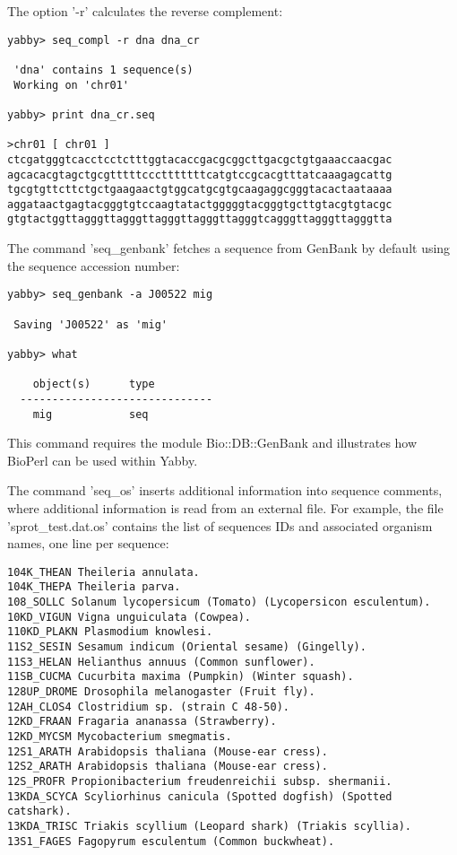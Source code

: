 The option '-r' calculates the reverse complement: 

\begin{verbatim}
yabby> seq_compl -r dna dna_cr

 'dna' contains 1 sequence(s)
 Working on 'chr01'

yabby> print dna_cr.seq

>chr01 [ chr01 ]
ctcgatgggtcacctcctctttggtacaccgacgcggcttgacgctgtgaaaccaacgac
agcacacgtagctgcgtttttccctttttttcatgtccgcacgtttatcaaagagcattg
tgcgtgttcttctgctgaagaactgtggcatgcgtgcaagaggcgggtacactaataaaa
aggataactgagtacgggtgtccaagtatactgggggtacgggtgcttgtacgtgtacgc
gtgtactggttagggttagggttagggttagggttagggtcagggttagggttagggtta
\end{verbatim}


The command 'seq\_genbank' fetches a sequence from GenBank
by default using the sequence accession number:

\begin{verbatim}
yabby> seq_genbank -a J00522 mig

 Saving 'J00522' as 'mig'

yabby> what

    object(s)      type
  ------------------------------
    mig            seq           
\end{verbatim}

This command requires the module Bio::DB::GenBank and illustrates how
BioPerl \cite{bioperl} can be used within Yabby.


The command 'seq\_os' inserts additional information into sequence
comments, where additional information is read from an external
file. For example, the file 'sprot\_test.dat.os' contains the
list of sequences IDs and associated organism names, one line
per sequence:

\begin{verbatim}
104K_THEAN Theileria annulata.
104K_THEPA Theileria parva.
108_SOLLC Solanum lycopersicum (Tomato) (Lycopersicon esculentum).
10KD_VIGUN Vigna unguiculata (Cowpea).
110KD_PLAKN Plasmodium knowlesi.
11S2_SESIN Sesamum indicum (Oriental sesame) (Gingelly).
11S3_HELAN Helianthus annuus (Common sunflower).
11SB_CUCMA Cucurbita maxima (Pumpkin) (Winter squash).
128UP_DROME Drosophila melanogaster (Fruit fly).
12AH_CLOS4 Clostridium sp. (strain C 48-50).
12KD_FRAAN Fragaria ananassa (Strawberry).
12KD_MYCSM Mycobacterium smegmatis.
12S1_ARATH Arabidopsis thaliana (Mouse-ear cress).
12S2_ARATH Arabidopsis thaliana (Mouse-ear cress).
12S_PROFR Propionibacterium freudenreichii subsp. shermanii.
13KDA_SCYCA Scyliorhinus canicula (Spotted dogfish) (Spotted catshark).
13KDA_TRISC Triakis scyllium (Leopard shark) (Triakis scyllia).
13S1_FAGES Fagopyrum esculentum (Common buckwheat).
\end{verbatim}

